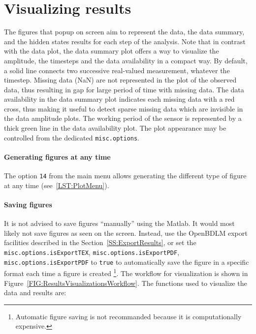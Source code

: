\section{Visualizing results}
\label{S:VisualizingResults}

The figures that popup on screen aim to represent the data, the data summary, and the hidden states results for each step of the analysis.
Note that in contrast with the data plot, the data summary plot offers a way  to visualize the amplitude, the timesteps and the data availability in a compact way.
By default, a solid line connects two successive real-valued measurement, whatever the timestep.
Missing data (NaN) are not represented in the plot of the observed data, thus resulting in gap for large period  of time with missing data.
The data availability in the data summary plot indicates each missing data with a red cross, thus making it useful to detect sparse missing data which are invisible in the data amplitude plots.
The working period of the sensor is represented by a thick green line in the data availability plot.
The plot appearance may be controlled from the dedicated \lstinline[basicstyle = \mlttfamily \small]!misc.options!.

\paragraph{Generating figures at any time}
The option \colorbox{light-gray}{\lstinline[basicstyle = \mlttfamily \small]!14!} from the main menu allows generating the different type of figure at any time (see~\ref{LST:PlotMenu}).

\paragraph{Saving figures}
It is not advised to save figures ``manually'' using the Matlab.
It would most likely not save figures as seen on the screen.
Instead, use the OpenBDLM export facilities described in the Section~\ref{SS:ExportResults}, or set the \lstinline[basicstyle = \mlttfamily \small]!misc.options.isExportTEX!, \lstinline[basicstyle = \mlttfamily \small]!misc.options.isExportPDF!, \lstinline[basicstyle = \mlttfamily \small]!misc.options.isExportPDF! to \lstinline[basicstyle = \mlttfamily \small]!true! to automatically save the figure in a specific format each time a figure is created \footnote{Automatic figure saving is not recommanded because it is computationally expensive.}.
The workflow for visualization is shown in Figure~\ref{FIG:ResultsVisualizationsWorkflow}. 
The functions used to visualize the data and results are:

